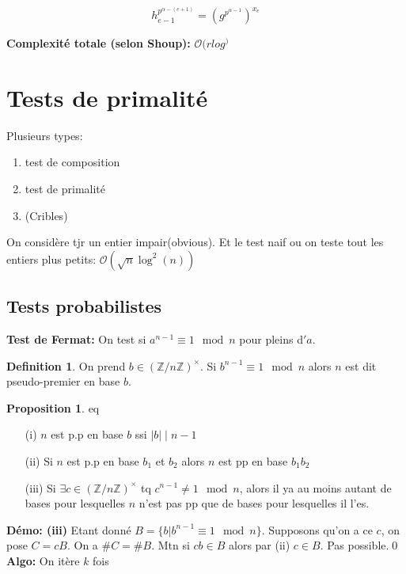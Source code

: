 \documentclass[12pt]{article}
\theoremstyle{plain}
\theoremstyle{definition}
\newtheorem{defn}[subsubsection]{Definition}
\newtheorem{prop}[subsubsection]{Proposition}
\newcommand{\Z}{\mathbb{Z}}
\newcommand{\Or}{\mathcal{O}}
\begin{document}
    \[h_{e-1}^{p^{\alpha-(e+1)}}=(g^{p^{\alpha-1}})^{x_e}\]

\textbf{Complexité totale (selon Shoup):} $\Or(rlog^)$


\section{Tests de primalité}
Plusieurs types: 
\begin{enumerate}
    \item test de composition
    \item test de primalité
    \item (Cribles)
\end{enumerate}

On considère tjr un entier impair(obvious). Et le test 
naif ou on teste tout les entiers plus petits: $\Or(\sqrt{n}\log^2(n))$

\subsection{Tests probabilistes}
\indent \textbf{Test de Fermat:} On test si 
$a^{n-1}\equiv1\mod n$ pour pleins d$'a$.
\begin{defn}
    On prend $b\in(\Z/n\Z)^{\times}$. Si $b^{n-1}\equiv1
    \mod n$ alors $n$ est dit pseudo-premier en base $b$.
\end{defn}

\begin{prop} eq\\
    \begin{itemize}
        \item[(i)] $n$ est p.p en base $b$ ssi $\lvert 
        b\rvert\mid n-1$
        \item[(ii)] Si $n$ est p.p en base $b_1$ et $b_2$
        alors $n$ est pp en base $b_1b_2$
        \item[(iii)]Si $\exists c\in (\Z/n\Z)^{\times}$ tq 
       $c^{n-1}\neq 1\mod n$, alors il ya au moins autant
       de bases pour lesquelles $n$ n'est pas pp que 
       de bases pour lesquelles il l'es.
    \end{itemize}
\end{prop}
\textbf{Démo: (iii)} Etant donné $B=\{b|b^{n-1}\equiv 1
\mod n\}$. Supposons qu'on a ce $c$, on pose $C=cB$. On a 
$\#C=\#B$. Mtn si $cb\in B$ alors par (ii) $c\in B$. Pas 
possible.\qed\\

\newpage
\textbf{Algo:} On itère $k$ fois
\end{document}
